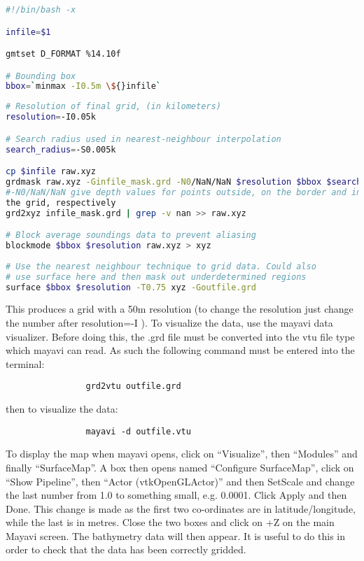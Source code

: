 \begin{lstlisting}[language = Bash]
#!/bin/bash -x 

infile=$1 

gmtset D_FORMAT %14.10f 

# Bounding box 
bbox=`minmax -I0.5m \${}infile` 

\end{lstlisting}
\begin{lstlisting}[language = Bash]
# Resolution of final grid, (in kilometers) 
resolution=-I0.05k 

# Search radius used in nearest-neighbour interpolation 
search_radius=-S0.005k 

cp $infile raw.xyz 
grdmask raw.xyz -Ginfile_mask.grd -N0/NaN/NaN $resolution $bbox $search_radius   
#-N0/NaN/NaN give depth values for points outside, on the border and inside 
the grid, respectively
grd2xyz infile_mask.grd | grep -v nan >> raw.xyz 

# Block average soundings data to prevent aliasing 
blockmode $bbox $resolution raw.xyz > xyz 
     
# Use the nearest neighbour technique to grid data. Could also 
# use surface here and then mask out underdetermined regions 
surface $bbox $resolution -T0.75 xyz -Goutfile.grd 
\end{lstlisting}

This produces a grid with a 50m resolution (to change the resolution just change the number after 
resolution=-I ). To visualize the data, use the mayavi data visualizer. Before doing this, 
the .grd file must be converted into the vtu file type which mayavi can read. As such the following 
command must be entered into the terminal:

\begin{lstlisting}
				grd2vtu outfile.grd
\end{lstlisting}

then to visualize the data:
\begin{lstlisting}		
				mayavi -d outfile.vtu 
\end{lstlisting}

To display the map when mayavi opens, click on “Visualize”, then “Modules” and finally
“SurfaceMap”. A box then opens named “Configure SurfaceMap”, click on “Show Pipeline”, then 
“Actor (vtkOpenGLActor)” and then SetScale and change the last number from 1.0 to something 
small, e.g. 0.0001. Click Apply and then Done. This change is made as the first two co-ordinates 
are in latitude/longitude, while the last is in metres. Close the two boxes and click on +Z 
on the main Mayavi screen. The bathymetry data will then appear. It is useful to do this in order 
to check that the data has been correctly gridded.

